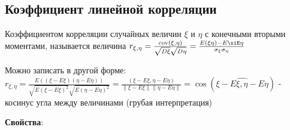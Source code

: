 \documentclass[12pt]{article}
\begin{document}
\subsection{Коэффициент линейной корреляции}

\hypertarget{correlation}{}

\Def Коэффициентом корреляции случайных величин $\xi$ и $\eta$ с конечными вторыми моментами,
называется величина $r_{\xi,\eta} = \frac{\mathrm{cov(\xi, \eta)}}{\sqrt{D\xi} \sqrt{D\eta}} = \frac{E(\xi\eta) - E\xiE\eta}{\sigma_\xi \sigma_\eta}$

Можно записать в другой форме: $r_{\xi,\eta} = \frac{E((\xi - E\xi)(\eta - E\eta))}{\sqrt{E(\xi - E\xi)^2}\sqrt{E(\eta - E\eta)^2}} = 
\frac{(\xi - E\xi, \eta - E\eta)}{\|\xi - E\xi\|\|\eta - E\eta\|} = \cos(\widehat{\xi - E\xi, \eta - E\eta})$ - косинус угла между величинами (грубая интерпретация)

\mediumvspace

\textbf{Свойства}:
\end{document}
